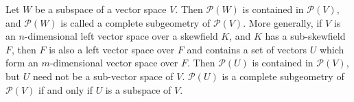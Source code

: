 Let $W$ be a subspace of a vector space $V$. Then $\mathcal{P}(W)$ is contained in $\mathcal{P}(V)$, and $\mathcal{P}(W)$ is called a complete subgeometry of $\mathcal{P}(V)$. More generally, if $V$ is an $n$-dimensional left vector space over a skewfield $K$, and $K$ has a sub-skewfield $F$, then $F$ is also a left vector space over $F$ and contains a set of vectors $U$ which form an $m$-dimensional vector space over $F$. Then $\mathcal{P}(U)$ is contained in $\mathcal{P}(V)$, but $U$ need not be a sub-vector space of $V$. $\mathcal{P}(U)$ is a complete subgeometry of $\mathcal{P}(V)$ if and only if $U$ is a subspace of $V$.
